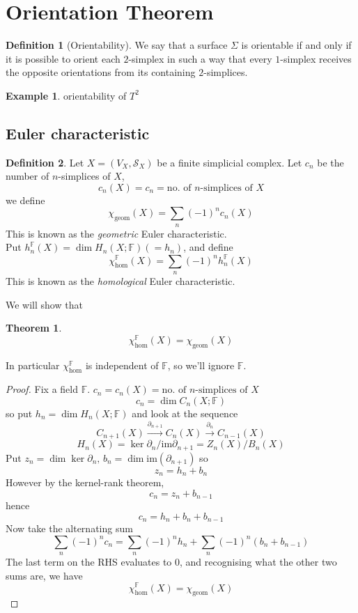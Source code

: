 \documentclass[a4paper,14pt]{extarticle}
\theoremstyle{definition}
\newtheorem*{theorem}{Theorem}
\newtheorem*{definition}{Definition}
\newtheorem*{eg}{Example}
\begin{document}
\section{Orientation Theorem}
\begin{definition}[Orientability]
	We say that a surface $\Sigma$ is orientable if and only if it is possible to orient
	each $2$-simplex in such a way that every $1$-simplex receives the opposite orientations
	from its containing $2$-simplices.
\end{definition}

\begin{eg}
	orientability of $T^2$
\end{eg}

\subsection{{Euler characteristic}}
\begin{definition}
	Let $X=(V_X,\mathcal{S}_X)$ be a finite simplicial complex. Let $c_n$ be the number of
	$n$-simplices of $X$, \[c_n(X)=c_n=\text{no. of $n$-simplices of $X$}\] we define
	\[\chi_\text{geom}(X)=\sum_{n}(-1)^n c_n(X)\]
	This is known as the \emph{geometric} Euler characteristic. \\

	Put $h_n^\mathbb{F}(X) = \dim H_n(X;\mathbb{F}) (=h_n)$, and define
	\[\chi_\text{hom}^\mathbb{F}(X)=\sum_n (-1)^n h_n^\mathbb{F}(X)\]
	This is known as the \emph{homological} Euler characteristic.
\end{definition}

We will show that 
\begin{theorem}
	\[\chi_\text{hom}^\mathbb{F}(X)=\chi_\text{geom}(X)\]
\end{theorem}
In particular $\chi_\text{hom}^\mathbb{F}$ is independent of $\mathbb{F}$, so we'll ignore
$\mathbb{F}$.

\begin{proof}
	Fix a field $\mathbb{F}$. $c_n=c_n(X)=\text{no. of $n$-simplices of $X$}$
	\[c_n=\dim C_n(X;\mathbb{F})\] so put $h_n=\dim H_n(X;\mathbb{F})$ and look at the 
	sequence
	\[C_{n+1}(X)\xrightarrow{\partial_{n+1}}C_n(X)\xrightarrow{\partial_n}C_{n-1}(X)\]
	\[H_n(X)=\ker\partial_n/\text{im}\partial_{n+1}=Z_n(X)/B_n(X)\]
	Put $z_n=\dim\ker\partial_n, \,b_n=\dim\text{im}(\partial_{n+1})$ so 
	\[z_n=h_n+b_n\] However by the kernel-rank theorem,
	\[c_n=z_n+b_{n-1}\] hence \[c_n=h_n+b_n+b_{n-1}\]
	Now take the alternating sum 
	\[\sum_{n} (-1)^n c_n=\sum_n (-1)^n h_n +\sum_n (-1)^n (b_n+b_{n-1})\]
	The last term on the RHS evaluates to 0, and recognising what the other two sums are, we
	have \[\chi_\text{hom}^\mathbb{F}(X)=\chi_\text{geom}(X)\]
\end{proof}
\end{document}
